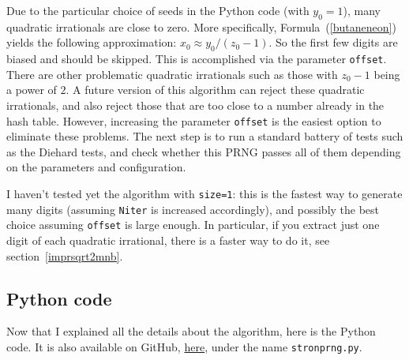 \documentclass[oneside,10pt]{book}
\begin{document}
Due to the particular choice of seeds in the Python code (with $y_0=1$), many quadratic irrationals are close to zero. More specifically, 
 Formula~(\ref{butaneneon}) yields the following approximation: $x_0\approx  y_0/(z_0-1)$.
 So the first few digits are biased and should be skipped. This is accomplished via the parameter \texttt{offset}. There are
 other problematic quadratic irrationals such as those with $z_0-1$ being a power of $2$. A future version of this algorithm can reject these quadratic irrationals, and also reject those that are too close to a number already in the hash table. However, increasing the parameter \texttt{offset} is the easiest option to eliminate these problems. The next step is to run 
 a standard battery of tests such as the \textcolor{index}{Diehard tests},  and check whether this PRNG passes all of them depending on the parameters and configuration. 

I haven't tested yet
 the algorithm with \texttt{size=1}: this is the fastest way to generate many digits (assuming \texttt{Niter} is increased
 accordingly), and possibly the best choice assuming \texttt{offset} is large enough. In particular, if you extract just one digit of each quadratic irrational, there is a faster way to do it, see section~\ref{imprsqrt2mnb}.
  
\subsection{Python code}\label{tr3te4}

Now that I explained all the details about the algorithm, here is the Python code. It is also available 
 on GitHub, \href{https://github.com/VincentGranville/Experimental-Math-Number-Theory/blob/main/Source-Code/strongprng.py}{here}, under the name \texttt{stronprng.py}.    \vspace{1ex}
\end{document}
